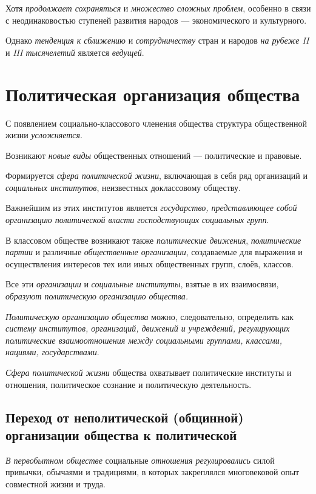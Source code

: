 \documentclass[a4paper,14pt,russian]{extreport}
\begin{document}
Хотя \emph{продолжает сохраняться} и \emph{множество сложных проблем}, особенно в связи с неодинаковостью ступеней развития народов --- экономического и культурного.

Однако \emph{тенденция к сближению} и \emph{сотрудничеству} стран и народов \emph{на рубеже II} и \emph{III тысячелетий} является \emph{ведущей}.

\section{Политическая организация общества}

С появлением социально-классового членения общества структура общественной жизни \emph{усложняется}.

Возникают \emph{новые виды} общественных отношений --- политические и правовые.

Формируется \emph{сфера политической жизни}, включающая в себя ряд организаций и \emph{социальных институтов}, неизвестных доклассовому обществу.

Важнейшим из этих институтов является \emph{государство, представляющее собой организацию политической власти господствующих социальных групп}.

В классовом обществе возникают также \emph{политические движения}\underline{,} \emph{политические партии} и различные \emph{общественные организации}, создаваемые для выражения и осуществления интересов тех или иных общественных групп, слоёв, классов.

Все эти \emph{организации} и \emph{социальные институты}, взятые в их взаимосвязи, \emph{образуют политическую организацию общества.}

\emph{Политическую организацию общества} можно, следовательно, определить как \emph{систему институтов, организаций, движений и учреждений, регулирующих политические взаимоотношения между социальными группами, классами, нациями, государствами}.

\emph{Сфера политической жизни} общества охватывает политические институты и отношения, политическое сознание и политическую деятельность.

\subsection{Переход от неполитической (общинной) организации общества к политической}

\emph{В первобытном обществе} социальные \emph{отношения регулировались} силой привычки, обычаями и традициями, в которых закреплялся многовековой опыт совместной жизни и труда.
\end{document}
